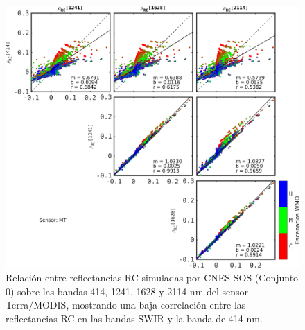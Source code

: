         \begin{figure}
        \centering
        \includegraphics[width=\textwidth]{pca/figures/rhoRCAllvsAll_MT_414.png}
        \caption[Relación entre reflectancias RC simuladas (a agua negra) sobre las bandas 414, 1241, 1628 y 2114 nm del sensor Terra/MODIS.]{Relación entre reflectancias RC simuladas por CNES-SOS (Conjunto $0$) sobre las bandas 414, 1241, 1628 y 2114 nm del sensor Terra/MODIS, mostrando una baja correlación entre las reflectancias RC en las bandas SWIR y la banda de 414 nm.}
        \label{pca:rhoRCAllvsAll_MT_414}
        \end{figure}

